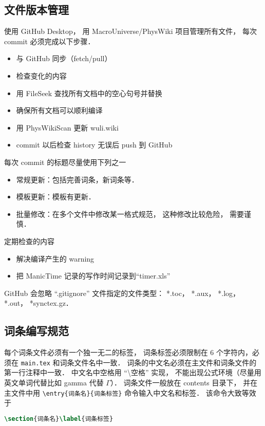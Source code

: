 \subsection{文件版本管理}
使用 GitHub Desktop， 用 MacroUniverse/PhysWiki 项目管理所有文件， 每次 commit 必须完成以下步骤．
\begin{itemize}
\item 与 GitHub 同步（fetch/pull）
\item 检查变化的内容
\item 用 FileSeek 查找所有文档中的空心句号并替换
\item 确保所有文档可以顺利编译
\item 用 PhysWikiScan 更新 wuli.wiki
\item commit 以后检查 history 无误后 push 到 GitHub
\end{itemize}
每次 commit 的标题尽量使用下列之一
\begin{itemize}
\item 常规更新：包括完善词条，新词条等．
\item 模板更新：模板有更新．
\item 批量修改：在多个文件中修改某一格式规范， 这种修改比较危险， 需要谨慎．
\end{itemize}
定期检查的内容
\begin{itemize}
\item 解决编译产生的 warning
\item 把 ManicTime 记录的写作时间记录到“timer.xls”
\end{itemize}

GitHub 会忽略 “.gitignore” 文件指定的文件类型： *.toc， *.aux， *.log， *.out， *synctex.gz．

\subsection{词条编写规范}

每个词条文件必须有一个独一无二的标签， 词条标签必须限制在 6 个字符内，必须在 \verb|main.tex| 和词条文件名中一致． 词条的中文名必须在主文件和词条文件的第一行注释中一致． 中文名中空格用 “\textbackslash 空格” 实现， 不能出现公式环境（尽量用英文单词代替比如 gamma 代替 $\Gamma$）． 词条文件一般放在 contents 目录下， 并在主文件中用 \verb|\entry{词条名}{词条标签}| 命令输入中文名和标签． 该命令大致等效于

\begin{lstlisting}[language=latex]
\section{词条名}\label{词条标签}
\end{lstlisting}

